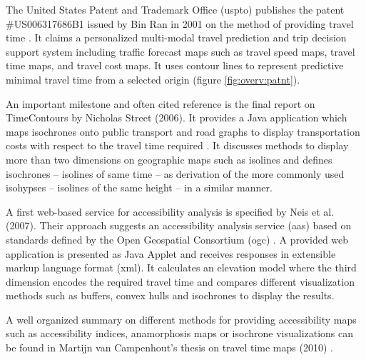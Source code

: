     The United States Patent and Trademark Office (\acrshort{uspto}) publishes
    the patent \#US006317686B1 issued by Bin Ran in 2001 on the method of
    providing travel time \cite{ran2001method}. It claims a personalized
    multi-modal travel prediction and trip decision support system including
    traffic forecast maps such as travel speed maps, travel time maps, and
    travel cost maps. It uses contour lines to represent predictive minimal
    travel time from a selected origin (figure \ref{fig:overv:patnt}).\par


    An important milestone and often cited reference is the final report on
    TimeContours by Nicholas Street (2006). It provides a Java application which
    maps isochrones onto public transport and road graphs to display
    transportation costs with respect to the travel time required
    \cite{street2006timecontours}. It discusses methods to display more than two
    dimensions on geographic maps such as isolines and defines isochrones --
    isolines of same time -- as derivation of the more commonly used isohypses
    -- isolines of the same height -- in a similar manner.\par


    A first web-based service for accessibility analysis is specified by
    Neis et al. (2007). Their approach suggests an accessibility analysis
    service (\acrshort{aas}) based on standards defined by the Open Geospatial
    Consortium (\acrshort{ogc}) \cite{neis2007webbasierte}. A provided web
    application is presented as Java Applet and receives responses in extensible
    markup language format (\acrshort{xml}). It calculates an elevation model
    where the third dimension encodes the required travel time and compares
    different visualization methods such as buffers, convex hulls and isochrones
    to display the results.\par

    A well organized summary on different methods for providing accessibility
    maps such as accessibility indices, anamorphosis maps or isochrone
    visualizations can be found in Martijn van Campenhout's thesis on travel
    time maps (2010) \cite{van2010travel}.\par

